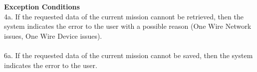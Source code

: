 \documentclass[letterpaper]{article}
\begin{document}
\textbf{Exception Conditions}\\
4a.  If the requested data of the current mission cannont be
retrieved, then the system indicates the error to the user with a
possible reason (One Wire Network issues, One Wire Device issues).
\\\\
6a.  If the requested data of the current mission cannot be saved,
then the system indicates the error to the user.
\end{document}
